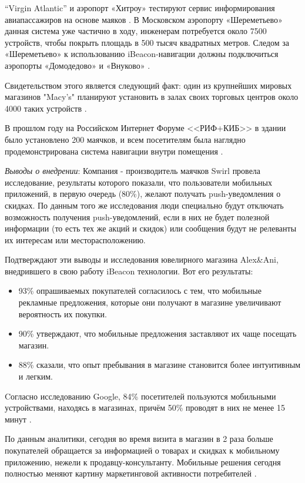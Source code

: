 “Virgin Atlantic” и аэропорт «Хитроу» тестируют сервис информирования авиапассажиров на основе маяков \cite{web:Heathrow}. В Московском аэропорту «Шереметьево» данная система уже частично в ходу, инженерам потребуется около 7500 устройств, чтобы покрыть площадь в 500 тысяч квадратных метров. Следом за «Шереметьево» к использованию iBeacon-навигации должны подключиться аэропорты «Домодедово» и «Внуково» \cite{web:Aeroports}.

Свидетельством этого является следующий факт: один из крупнейших мировых магазинов "Macy's"  планируют установить в залах своих торговых центров около 4000 таких устройств \cite{web:Macy}. 

В прошлом году на Российском Интернет Форуме <<РИФ+КИБ>> в здании было установлено 200 маячков, и всем посетителям была наглядно продемонстрирована система навигации внутри помещения \cite{web:RifKib}.

\textit{Выводы о внедрении}: 
Компания - производитель маячков Swirl провела исследование, результаты которого показали, что пользователи мобильных приложений, в первую очередь (80\%), желают получать push-уведомления о скидках. По данным того же исследования люди специально будут отключать возможность получения push-уведомлений, если в них не будет полезной информации (то есть тех же акций и скидок) или сообщения будут не релеванты их интересам или месторасположению.

Подтверждают эти выводы и исследования ювелирного магазина Alex\&Ani, внедрившего в свою работу iBeacon технологии. Вот его результаты:
\begin{itemize}
    \item
    93\% опрашиваемых покупателей согласилось с тем, что мобильные рекламные предложения, которые они получают в магазине увеличивают вероятность их покупки.
    \item
    90\% утверждают, что мобильные предложения заставляют их чаще посещать магазин.
    \item
    88\% сказали, что опыт пребывания в магазине становится более интуитивным и легким.
\end{itemize}

Cогласно исследованию Google, 84\% посетителей пользуются мобильными устройствами, находясь в магазинах, причём 50\% проводят в них не менее 15 минут \cite{web:GoogleShopExpirience}.

По данным аналитики, сегодня во время визита в магазин в 2 раза больше покупателей обращается за информацией о товарах и скидках к мобильному приложению, нежели к продавцу-консультанту. Мобильные решения сегодня полностью меняют картину маркетинговой активности потребителей \cite{web:CasesZero}.